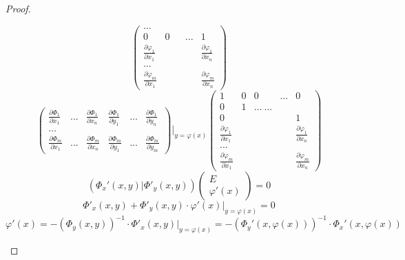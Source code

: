 \documentclass[main]{subfiles}
\begin{document}
\begin{proof}
\begin{enumerate}
\[\begin{pmatrix}
						...                                                                                             \\
						0                                       & 0 &   & ... & 1                                       \\
						\frac{\partial \varphi_1}{\partial x_1} &   &   &     & \frac{\partial \varphi_1}{\partial x_n} \\
						...                                                                                             \\
						\frac{\partial \varphi_m}{\partial x_1} &   &   &     & \frac{\partial \varphi_m}{\partial x_n}
					\end{pmatrix}
				\]
				\[\begin{pmatrix}
						\frac{\partial \Phi_1}{\partial x_1} & ... & \frac{\partial \Phi_1}{\partial x_n} &
						\frac{\partial \Phi_1}{\partial y_1} & ... & \frac{\partial \Phi_1}{\partial y_n}   \\
						...                                                                                 \\
						\frac{\partial \Phi_m}{\partial x_1} & ... & \frac{\partial \Phi_m}{\partial x_n} &
						\frac{\partial \Phi_m}{\partial y_1} & ... & \frac{\partial \Phi_m}{\partial y_m}
					\end{pmatrix}
					\Bigg|_{y = \varphi(x)}
					\begin{pmatrix}
						1                                       & 0 & 0     & ... & 0                                       \\
						0                                       & 1 & ...\
						...                                                                                                 \\
						0                                       &   &       &     & 1                                       \\
						\frac{\partial \varphi_1}{\partial x_1} &   &       &     & \frac{\partial \varphi_1}{\partial x_n} \\
						...                                                                                                 \\
						\frac{\partial \varphi_m}{\partial x_1} &   &       &     & \frac{\partial \varphi_m}{\partial x_n}
					\end{pmatrix}\]
				\[(\Phi_x'(x, y) | \Phi'_y(x, y)) \begin{pmatrix}
						E \\
						\varphi'(x)
					\end{pmatrix} = 0\]
				\[\Phi'_x(x, y) + \Phi'_y(x, y) \cdot \varphi'(x) \bigg|_{y = \varphi(x)}  = 0\]
				\[\varphi'(x) = - (\Phi_y(x,y))^{-1} \cdot \Phi'_x(x, y) \bigg|_{y = \varphi(x)}  =
					-(\Phi_y'(x, \varphi(x)))^{-1}  \cdot \Phi_x'(x, \varphi(x))\]
		\end{enumerate}
	\end{proof}
\end{document}
